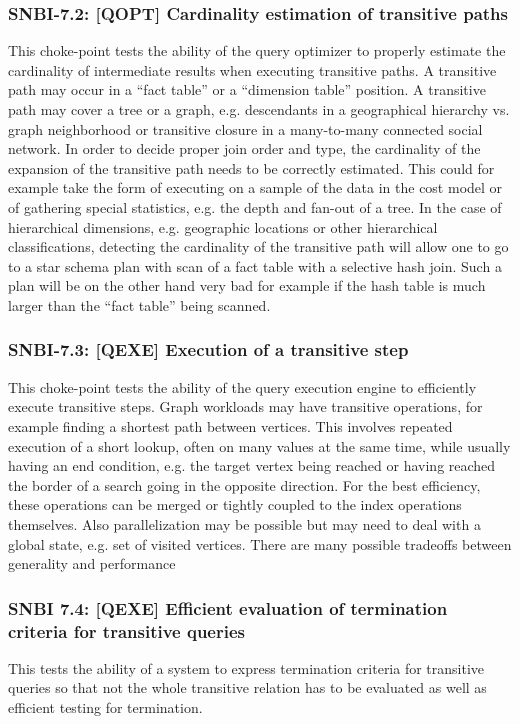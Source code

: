 \subsubsection{SNBI-7.2: [QOPT]  Cardinality estimation of transitive paths}
\label{choke_point_7.2}
This choke-point tests the ability of the query optimizer to properly estimate the cardinality of intermediate results when executing transitive paths. A transitive path may occur in a ``fact table'' or a ``dimension table'' position.
A transitive path may cover a tree or a graph, e.g. descendants in a geographical hierarchy vs. graph neighborhood or transitive closure in a many-to-many connected social network.
In order to decide proper join order and type, the cardinality of the expansion of the transitive path needs to be correctly estimated.
This could for example take the form of executing on a sample of the data in the cost model or of gathering special statistics, e.g. the depth and fan-out of a tree. In the case of hierarchical dimensions,
e.g. geographic locations or other hierarchical classifications, detecting the cardinality of the transitive path will allow one to go to a star schema plan with scan of a fact table with a selective hash join.
Such a plan will be on the other hand very bad for example if the hash table is much larger than the ``fact table'' being scanned.

\subsubsection{SNBI-7.3: [QEXE] Execution of a transitive step}
\label{choke_point_7.3}
This choke-point tests the ability of the query execution engine to efficiently execute transitive steps. Graph workloads may have transitive operations, for example finding a shortest path between vertices.
This involves repeated execution of a short lookup, often on many values at the same time, while usually having an end condition, e.g. the target vertex being reached or having reached the border of a search going in the opposite direction.
For the best efficiency, these operations can be merged or tightly coupled to the index operations themselves. Also parallelization may be possible but may need to deal with a global state, e.g. set of visited vertices.
There are many possible tradeoffs between generality and performance

\subsubsection{SNBI 7.4: [QEXE] Efficient evaluation of termination criteria for transitive queries}
\label{choke_point_7.4}
This tests the ability of a system to express termination criteria for transitive queries so that not the whole transitive relation has to be evaluated as well as efficient testing for termination.

